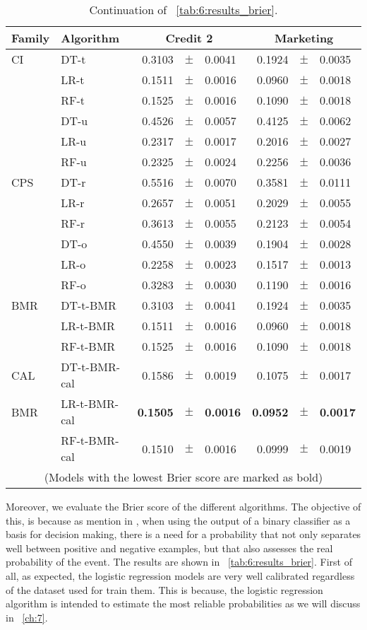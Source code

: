 \begin{table}[t]
    \centering
    \footnotesize
    \begin{tabular}{l l r@{\hskip 0in}c@{\hskip 0in}l r@{\hskip 0in}c@{\hskip 0in}l  } %
    \hline
    \bf{Family} & \bf{Algorithm} &  \multicolumn{3}{c}{\bf{Credit 2}} 
& \multicolumn{3}{c}{\bf{Marketing}} \\ 
    \hline
CI&DT-t & 0.3103 &$\pm$& 0.0041 & 0.1924 &$\pm$& 0.0035\\ 
&LR-t & 0.1511 &$\pm$& 0.0016 & 0.0960 &$\pm$& 0.0018\\ 
&RF-t & 0.1525 &$\pm$& 0.0016 & 0.1090 &$\pm$& 0.0018\\ 
&DT-u & 0.4526 &$\pm$& 0.0057 & 0.4125 &$\pm$& 0.0062\\ 
&LR-u & 0.2317 &$\pm$& 0.0017 & 0.2016 &$\pm$& 0.0027\\ 
&RF-u & 0.2325 &$\pm$& 0.0024 & 0.2256 &$\pm$& 0.0036\\ 
\hline 
CPS&DT-r & 0.5516 &$\pm$& 0.0070 & 0.3581 &$\pm$& 0.0111\\ 
&LR-r & 0.2657 &$\pm$& 0.0051 & 0.2029 &$\pm$& 0.0055\\ 
&RF-r & 0.3613 &$\pm$& 0.0055 & 0.2123 &$\pm$& 0.0054\\ 
&DT-o & 0.4550 &$\pm$& 0.0039 & 0.1904 &$\pm$& 0.0028\\ 
&LR-o & 0.2258 &$\pm$& 0.0023 & 0.1517 &$\pm$& 0.0013\\ 
&RF-o & 0.3283 &$\pm$& 0.0030 & 0.1190 &$\pm$& 0.0016\\ 
\hline 
BMR&DT-t-BMR & 0.3103 &$\pm$& 0.0041 & 0.1924 &$\pm$& 0.0035\\ 
&LR-t-BMR & 0.1511 &$\pm$& 0.0016 & 0.0960 &$\pm$& 0.0018\\ 
&RF-t-BMR & 0.1525 &$\pm$& 0.0016 & 0.1090 &$\pm$& 0.0018\\ 
\hline 
CAL&DT-t-BMR-cal & 0.1586 &$\pm$& 0.0019 & 0.1075 &$\pm$& 0.0017\\ 
BMR&LR-t-BMR-cal & \bf{0.1505} &\bf{$\pm$}& \bf{0.0016} & \bf{0.0952} &\bf{$\pm$}& \bf{0.0017}\\ 
&RF-t-BMR-cal & 0.1510 &$\pm$& 0.0016 & 0.0999 &$\pm$& 0.0019\\ 
\hline 
  \multicolumn{8}{c}{(Models with the lowest Brier score are marked as bold)}
  \end{tabular}
    \caption{Continuation of \tablename{~\ref{tab:6:results_brier}}.}
    \label{tab:6:results_savings2}
  \end{table}

  
Moreover, we evaluate the Brier score of the different algorithms. The objective of this, is 
because as mention in  \citep{cohen2004}, when using the output of a binary classifier as a basis 
for decision making, there is a need for a probability that not only separates well between 
positive 
and negative examples, but that also assesses the real probability of the event. The results are 
shown in \tablename{~\ref{tab:6:results_brier}}. First of all, as expected, the logistic regression 
models are very well calibrated regardless of the dataset used for train them. This is because, the 
logistic regression algorithm is intended to estimate the most reliable probabilities as we will 
discuss in \chaptername{~\ref{ch:7}}.

